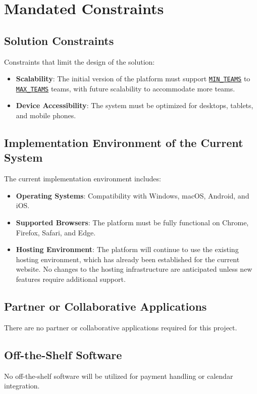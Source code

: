 \documentclass[12pt, titlepage]{article}
\begin{document}
\section{Mandated Constraints}

\subsection{Solution Constraints}
Constraints that limit the design of the solution:
\begin{itemize}
    \item \textbf{Scalability}: The initial version of the platform must support \hyperref[MIN_TEAMS]{\texttt{MIN\_TEAMS}} to \hyperref[MAX_TEAMS]{\texttt{MAX\_TEAMS}} teams, with future scalability to accommodate more teams.
    \item \textbf{Device Accessibility}: The system must be optimized for desktops, tablets, and mobile phones.
\end{itemize}

\subsection{Implementation Environment of the Current System}
The current implementation environment includes:
\begin{itemize}
    \item \textbf{Operating Systems}: Compatibility with Windows, macOS, Android, and iOS.
    \item \textbf{Supported Browsers}: The platform must be fully functional on Chrome, Firefox, Safari, and Edge.
    \item \textbf{Hosting Environment}: The platform will continue to use the existing hosting environment, which has already been established for the current website. No changes to the hosting infrastructure are anticipated unless new features require additional support.
\end{itemize}

\subsection{Partner or Collaborative Applications}
There are no partner or collaborative applications required for this project.

\subsection{Off-the-Shelf Software}
No off-the-shelf software will be utilized for payment handling or calendar integration.
\end{document}
